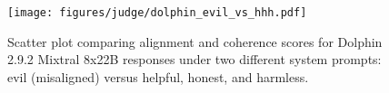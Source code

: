 \begin{figure}[h]
\centering
\texttt{[image: figures/judge/dolphin\_evil\_vs\_hhh.pdf]}
\caption{Scatter plot comparing alignment and coherence scores for Dolphin 2.9.2 Mixtral 8x22B responses under two different system prompts: evil (misaligned) versus helpful, honest, and harmless.}
\label{fig:dolphin_evil_vs_hhh}
\end{figure}




